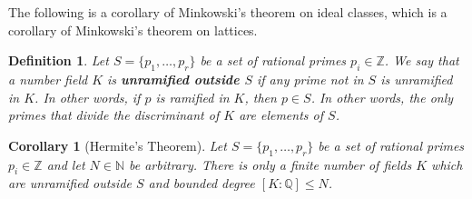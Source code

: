 \documentclass[12pt]{article}
\newtheorem*{defn}{Definition}
\newtheorem*{cor}{Corollary}
\newcommand{\Nats}{\mathbb{N}}
\newcommand{\Ints}{\mathbb{Z}}
\newcommand{\Rats}{\mathbb{Q}}
\begin{document}
The following is a corollary of Minkowski's theorem on ideal classes, which is a corollary of Minkowski's theorem on lattices.

\begin{defn}
Let $S=\{p_1,\ldots,p_r\}$ be a set of rational primes $p_i \in \Ints$. We say that a number field $K$ is {\bf unramified outside $S$} if any prime not in $S$ is unramified in $K$. In other words, if $p$ is ramified in $K$, then $p\in S$. In other words, the only primes that divide the discriminant of $K$ are elements of $S$.
\end{defn}

\begin{cor}[Hermite's Theorem]
Let $S=\{p_1,\ldots,p_r\}$ be a set of rational primes $p_i \in \Ints$ and let $N\in \Nats$ be arbitrary. There is only a finite number of fields $K$ which are unramified outside $S$ and bounded degree $[K:\Rats]\leq N$.  
\end{cor}
\end{document}
